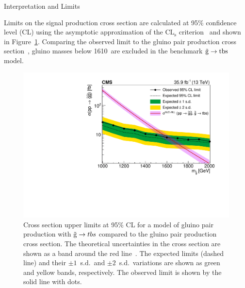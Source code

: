 \begin{section}{Interpretation and Limits}

Limits on the signal production cross section are calculated at 95\% confidence level (CL) using the asymptotic approximation of the $\textrm{CL}_\textrm{s}$ criterion~\cite{0954-3899-28-10-313,CMS-NOTE-2011-005,Cowan:2010js,Junk:1999kv} and shown in Figure~\ref{fig:limits}.
Comparing the observed limit to the gluino pair production cross section~\cite{XSecgluinogluino}, gluino masses below 1610~\GeV are excluded in the benchmark $\tilde{\mathrm{g}} \to \mathrm{tbs}$ model.

\begin{figure}[tbp!]
\centering
\includegraphics[angle=0,width=0.80\columnwidth]{fig/limits.pdf}
\caption{Cross section upper limits at 95\% CL for a model of gluino pair production with $\tilde{\mathrm{g}} \to tbs$ compared to the gluino pair production cross section.
The theoretical uncertainties in the cross section are shown as a band around the
red line~\cite{XSecgluinogluino}.
The expected limits (dashed line) and their $\pm1$~s.d.\ and $\pm2$~s.d.\ variations are shown as green and yellow bands, respectively.
The observed limit is shown by the solid line with dots.}
\label{fig:limits}
\end{figure}

\end{section}

